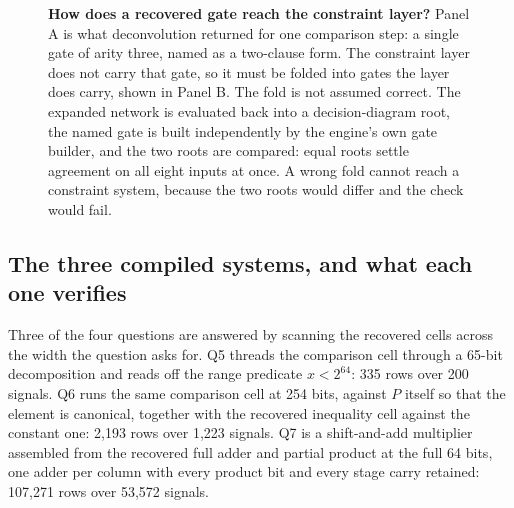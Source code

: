 \documentclass[11pt,a4paper]{article}
\begin{document}
\begin{figure}[htbp]
\centering
{}
\caption{\textbf{How does a recovered gate reach the constraint layer?}
Panel A is what deconvolution returned for one comparison step: a single gate
of arity three, named as a two-clause form. The constraint layer does not carry
that gate, so it must be folded into gates the layer does carry, shown in
Panel B. The fold is not assumed correct. The expanded network is evaluated
back into a decision-diagram root, the named gate is built independently by the
engine's own gate builder, and the two roots are compared: equal roots settle
agreement on all eight inputs at once. A wrong fold cannot reach a constraint
system, because the two roots would differ and the check would fail.}
\label{fig:expansion}
\end{figure}

\subsection{The three compiled systems, and what each one verifies}
Three of the four questions are answered by scanning the recovered cells across
the width the question asks for. Q5 threads the comparison cell through a
65-bit decomposition and reads off the range predicate $x<2^{64}$: 335 rows over
200 signals. Q6 runs the same comparison cell at 254 bits, against $P$ itself so
that the element is canonical, together with the recovered inequality cell
against the constant one: 2{,}193 rows over 1{,}223 signals. Q7 is a
shift-and-add multiplier assembled from the recovered full adder and partial
product at the full 64 bits, one adder per column with every product bit and
every stage carry retained: 107{,}271 rows over 53{,}572 signals.
\end{document}

